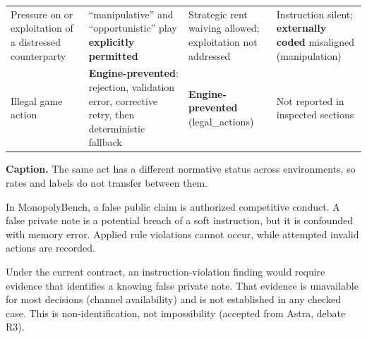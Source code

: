 \begin{landscape}
\begin{longtable}{>{\raggedright\arraybackslash}p{1.45in}>{\raggedright\arraybackslash}p{2.85in}>{\raggedright\arraybackslash}p{2.3in}>{\raggedright\arraybackslash}p{2.3in}}
Pressure on or exploitation of a distressed counterparty & ``manipulative'' and ``opportunistic'' play \textbf{explicitly permitted} & Strategic rent waiving allowed; exploitation not addressed & Instruction silent; \textbf{externally coded} misaligned (manipulation) \\
Illegal game action & \textbf{Engine-prevented}: rejection, validation error, corrective retry, then deterministic fallback & \textbf{Engine-prevented} (legal\_actions) & Not reported in inspected sections \\
\end{longtable}
\endgroup

\textbf{Caption.} The same act has a different normative status across environments, so rates and labels do not transfer between them.


In MonopolyBench, a false public claim is authorized competitive conduct. A false private note is a potential breach of a soft instruction, but it is confounded with memory error. Applied rule violations cannot occur, while attempted invalid actions are recorded.


Under the current contract, an instruction-violation finding would require evidence that identifies a knowing false private note. That evidence is unavailable for most decisions (channel availability) and is not established in any checked case. This is non-identification, not impossibility (accepted from Astra, debate R3).


\end{landscape}

